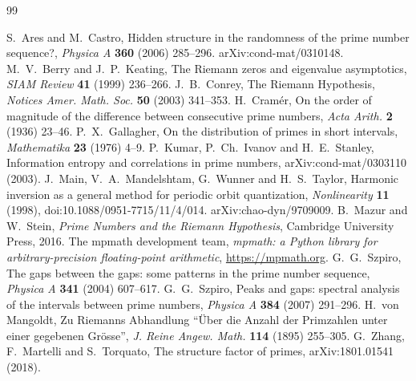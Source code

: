 \documentclass[11pt,a4paper]{article}
\begin{document}
\clearpage
\renewcommand{\refname}{References}
\titleformat{\section}{\sffamily\bfseries\LARGE\color{ink}}{}{0pt}{}
\begin{thebibliography}{99}\small{}
 S.~Ares and M.~Castro, Hidden structure in the randomness of the prime number sequence?, \emph{Physica A} \textbf{360} (2006) 285--296. arXiv:cond-mat/0310148.
 M.~V.~Berry and J.~P.~Keating, The Riemann zeros and eigenvalue asymptotics, \emph{SIAM Review} \textbf{41} (1999) 236--266.
 J.~B.~Conrey, The Riemann Hypothesis, \emph{Notices Amer. Math. Soc.} \textbf{50} (2003) 341--353.
 H.~Cramér, On the order of magnitude of the difference between consecutive prime numbers, \emph{Acta Arith.} \textbf{2} (1936) 23--46.
 P.~X.~Gallagher, On the distribution of primes in short intervals, \emph{Mathematika} \textbf{23} (1976) 4--9.
 P.~Kumar, P.~Ch.~Ivanov and H.~E.~Stanley, Information entropy and correlations in prime numbers, arXiv:cond-mat/0303110 (2003).
 J.~Main, V.~A.~Mandelshtam, G.~Wunner and H.~S.~Taylor, Harmonic inversion as a general method for periodic orbit quantization, \emph{Nonlinearity} \textbf{11} (1998), doi:10.1088/0951-7715/11/4/014. arXiv:chao-dyn/9709009.
 B.~Mazur and W.~Stein, \emph{Prime Numbers and the Riemann Hypothesis}, Cambridge University Press, 2016.
 The mpmath development team, \emph{mpmath: a Python library for arbitrary-precision floating-point arithmetic}, \url{https://mpmath.org}.
 G.~G.~Szpiro, The gaps between the gaps: some patterns in the prime number sequence, \emph{Physica A} \textbf{341} (2004) 607--617.
 G.~G.~Szpiro, Peaks and gaps: spectral analysis of the intervals between prime numbers, \emph{Physica A} \textbf{384} (2007) 291--296.
 H.~von Mangoldt, Zu Riemanns Abhandlung ``Über die Anzahl der Primzahlen unter einer gegebenen Grösse'', \emph{J. Reine Angew. Math.} \textbf{114} (1895) 255--305.
 G.~Zhang, F.~Martelli and S.~Torquato, The structure factor of primes, arXiv:1801.01541 (2018).
\end{thebibliography}
\end{document}
